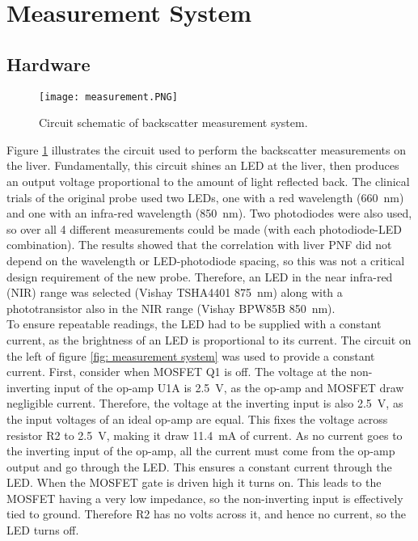 \section{Measurement System}
\subsection{Hardware}

\begin{figure}[htbp]
	\centering
	\texttt{[image: measurement.PNG]}
	\caption{Circuit schematic of backscatter measurement system.}
	\label{fig: measurement schematic}
\end{figure}

Figure \ref{fig: measurement schematic} illustrates the circuit used to perform the backscatter measurements on the liver. Fundamentally, this circuit shines an LED at the liver, then produces an output voltage proportional to the amount of light reflected back. The clinical trials of the original probe \cite{Robertson} used two LEDs, one with a red wavelength (\SI{660}{\nano\metre}) and one with an infra-red wavelength (\SI{850}{\nano\metre}). Two photodiodes were also used, so over all 4 different measurements could be made (with each photodiode-LED combination). The results showed that the correlation with liver PNF did not depend on the wavelength or LED-photodiode spacing, so this was not a critical design requirement of the new probe. Therefore, an LED in the near infra-red (NIR) range was selected (Vishay TSHA4401 \cite{tsha4401} \SI{875}{\nano\metre}) along with a phototransistor also in the NIR range (Vishay BPW85B \cite{bpw85b} \SI{850}{\nano\metre}).\\

To ensure repeatable readings, the LED had to be supplied with a constant current, as the brightness of an LED is proportional to its current. The circuit on the left of figure \ref{fig: measurement system} was used to provide a constant current. First, consider when MOSFET Q1 is off. The voltage at the non-inverting input of the op-amp U1A is \SI{2.5}{\volt}, as the op-amp and MOSFET draw negligible current. Therefore, the voltage at the inverting input is also \SI{2.5}{\volt}, as the input voltages of an ideal op-amp are equal. This fixes the voltage across resistor R2 to \SI{2.5}{\volt}, making it draw \SI{11.4}{\milli\ampere} of current. As no current goes to the inverting input of the op-amp, all the current must come from the op-amp output and go through the LED. This ensures a constant current through the LED. When the MOSFET gate is driven high it turns on. This leads to the MOSFET having a very low impedance, so the non-inverting input is effectively tied to ground. Therefore R2 has no volts across it, and hence no current, so the LED turns off.\\

